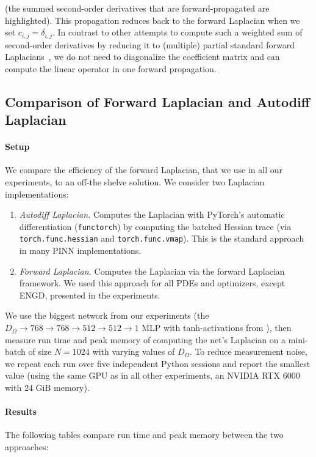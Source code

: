 (the summed second-order derivatives that are forward-propagated are highlighted).
This propagation reduces back to the forward Laplacian  when we set $c_{i,j} = \delta_{i,j}$.
In contrast to other attempts to compute such a weighted sum of second-order derivatives by reducing it to (multiple) partial standard forward Laplacians~\cite{li2024dof}, we do not need to diagonalize the coefficient matrix and can compute the linear operator in one forward propagation.

\subsection{Comparison of Forward Laplacian and Autodiff Laplacian}\label{app:subsec:comparison}

\paragraph{Setup}
We compare the efficiency of the forward Laplacian, that we use in all our experiments, to an off-the shelve solution. We consider two Laplacian implementations:
\begin{enumerate}
  \item \emph{Autodiff Laplacian.} Computes the Laplacian with PyTorch's automatic differentiation (\texttt{functorch}) by computing the batched Hessian trace (via \texttt{torch.func.hessian} and \texttt{torch.func.vmap}). This is the standard approach in many PINN implementations.
  \item \emph{Forward Laplacian.} Computes the Laplacian via the forward Laplacian framework. We used this approach for all PDEs and optimizers, except ENGD, presented in the experiments.
\end{enumerate}

We use the biggest network from our experiments (the $D_\Omega \to 768\to 768\to 512\to 512\to 1$ MLP with tanh-activations from ), then measure run time and peak memory of computing the net's Laplacian on a mini-batch of size $N=1024$ with varying values of $D_{\Omega}$.
To reduce measurement noise, we repeat each run over five independent Python sessions and report the smallest value (using the same GPU as in all other experiments, an NVIDIA RTX 6000 with 24 GiB memory).

\paragraph{Results}
The following tables compare run time and peak memory between the two approaches:

